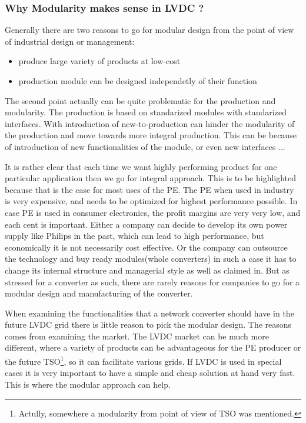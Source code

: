 \documentclass[]{scrartcl}
\begin{document}
\subsubsection{Why Modularity makes sense in LVDC ?}

Generally there are two reasons to go for modular design from the point of view of industrial design or management\cite{Huang1998}:
\begin{itemize}
	\item produce large variety of products at low-cost
	\item production module can be designed independetly of their function
\end{itemize}

The second point actually can be quite problematic for the production and modularity. The production is based on standarized modules with standarized interfaces. With introduction of new-to-production \cite{JulianaHsuanMikkola2003} can hinder the modularity of the production and move towards more integral production. This can be because of introduction of new functionalities of the module, or even new interfaces ... 


It is rather clear that each time we want highly performing product for one particular application then we go for integral approach. This is to be highlighted because that is the case for most uses of the PE. The PE when used in industry is very expensive, and needs to be optimized for highest performance possible. In case PE is used in consumer electronics, the profit margins are very very low, and each cent is important. Either a company can decide to develop its own power supply like Philips in the past, which can lead to high performance, but economically it is not necessarily cost effective. Or the company can outsource the technology and buy ready modules(whole converters) in such a case it has to change its internal structure and managerial style as well as claimed in\cite{Fine2005}. But as stressed for a converter as such, there are rarely reasons for companies to go for a modular design and manufacturing of the converter. 


When examining the functionalities that a network converter should have in the future LVDC grid there is little reason to pick the modular design. The reasons comes from examining the market. The LVDC market can be much more different, where a variety of products can be advantageous for the PE producer or the future TSO\footnote{Actully, somewhere a modularity from point of view of TSO was mentioned.}, so it can facilitate various grids. If LVDC is used in special cases it is very important to have a simple and cheap solution at hand very fast. This is where the modular approach can help. 
\end{document}
